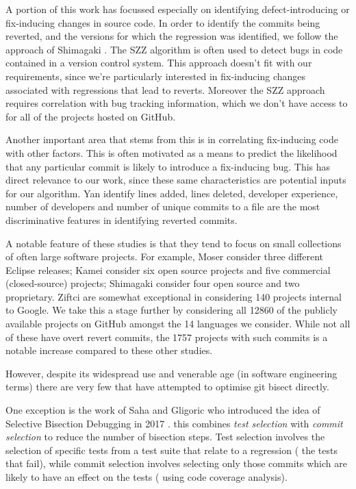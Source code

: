\documentclass[10pt,journal,compsoc]{IEEEtran}
\begin{document}
A portion of this work has focussed especially on identifying defect-introducing or fix-inducing changes in source code. In order to identify the commits being reverted, and the versions for which the regression was identified, we follow the approach of Shimagaki \etal \cite{shimagaki2016}. The SZZ algorithm \cite{sliwerski2005} is often used to detect bugs in code contained in a version control system. This approach doesn't fit with our requirements, since we're particularly interested in fix-inducing changes associated with regressions that lead to reverts. Moreover the SZZ approach requires correlation with bug tracking information, which we don't have access to for all of the projects hosted on GitHub.

Another important area that stems from this is in correlating fix-inducing code with other factors. This is often motivated as a means to predict the likelihood that any particular commit is likely to introduce a fix-inducing bug. This has direct relevance to our work, since these same characteristics are potential inputs for our algorithm. Yan \etal \cite{yan2019} identify lines added, lines deleted, developer experience, number of developers and number of unique commits to a file are the most discriminative features in identifying reverted commits.

A notable feature of these studies is that they tend to focus on small collections of often large software projects. For example, Moser \etal \cite{moser2008} consider three different Eclipse releases; Kamei \etal \cite{kamei2013} consider six open source projects and five commercial (closed-source) projects; Shimagaki \etal \cite{shimagaki2016} consider four open source and two proprietary. Ziftci \etal \cite{ziftci2013, ziftci2017} are somewhat exceptional in considering 140 projects internal to Google. We take this a stage further by considering all 12860 of the publicly available projects on GitHub amongst the 14 languages we consider. While not all of these have overt revert commits, the 1757 projects with such commits is a notable increase compared to these other studies.

However, despite its widespread use and venerable age (in software engineering terms) there are very few that have attempted to optimise {\code git bisect} directly.

One exception is the work of Saha and Gligoric who introduced the idea of Selective Bisection Debugging in 2017 \cite{saha2017}. this combines {\it test selection\/} with {\it commit selection\/} to reduce the number of bisection steps. Test selection involves the selection of specific tests from a test suite that relate to a regression (\ie\/ the tests that fail), while commit selection involves selecting only those commits which are likely to have an effect on the tests (\eg\/ using code coverage analysis).
\end{document}
